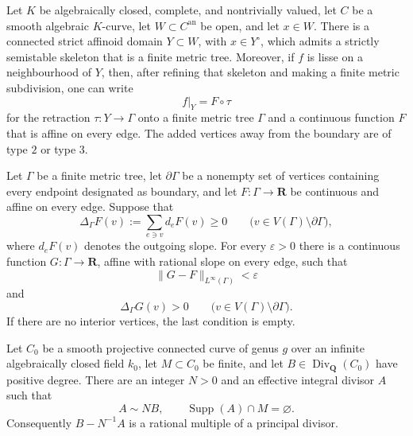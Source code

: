 
\begin{lemma}
\label{lem:p063-local-tree-affinoid}
Let $K$ be algebraically closed, complete, and nontrivially valued, let
$C$ be a smooth algebraic $K$-curve, let $W\subset C^{\mathrm{an}}$ be
open, and let $x\in W$.  There is a connected strict affinoid domain
$Y\subset W$, with $x\in Y^\circ$, which admits a strictly semistable
skeleton that is a finite metric tree.  Moreover, if $f$ is lisse on a
neighbourhood of $Y$, then, after refining that skeleton and making a
finite metric subdivision, one can write
\[
                         f|_Y=F\circ\tau
\]
for the retraction $\tau:Y\to\Gamma$ onto a finite metric tree $\Gamma$
and a continuous function $F$ that is affine on every edge.  The added
vertices away from the boundary are of type $2$ or type $3$.
\end{lemma}

\begin{lemma}
\label{lem:p063-tree-rational-strictification}
Let $\Gamma$ be a finite metric tree, let $\partial\Gamma$ be a nonempty
set of vertices containing every endpoint designated as boundary, and let
$F:\Gamma\to\mathbf R$ be continuous and affine on every edge.  Suppose
that
\begin{equation}
\label{eq:p063-graph-subharmonicity}
 \Delta_\Gamma F(v):=\sum_{e\ni v}d_eF(v)\geq0
 \qquad
 \bigl(v\in V(\Gamma)\setminus\partial\Gamma\bigr),
\end{equation}
where $d_eF(v)$ denotes the outgoing slope.  For every $\varepsilon>0$
there is a continuous function $G:\Gamma\to\mathbf R$, affine with
rational slope on every edge, such that
\begin{equation}
\label{eq:p063-graph-rational-error}
             \lVert G-F\rVert_{L^\infty(\Gamma)}<\varepsilon
\end{equation}
and
\begin{equation}
\label{eq:p063-graph-strict-mass}
 \Delta_\Gamma G(v)>0
 \qquad
 \bigl(v\in V(\Gamma)\setminus\partial\Gamma\bigr).
\end{equation}
If there are no interior vertices, the last condition is empty.
\end{lemma}

\begin{lemma}
\label{lem:p063-residual-divisor-moving}
Let $C_0$ be a smooth projective connected curve of genus $g$ over an
infinite algebraically closed field $k_0$, let $M\subset C_0$ be finite, and let
$B\in\operatorname{Div}_{\mathbf Q}(C_0)$ have positive degree.  There are
an integer $N>0$ and an effective integral divisor $A$ such that
\begin{equation}
\label{eq:p063-moving-divisor}
          A\sim NB,
          \qquad
          \operatorname{Supp}(A)\cap M=\varnothing.
\end{equation}
Consequently $B-N^{-1}A$ is a rational multiple of a principal divisor.
\end{lemma}


